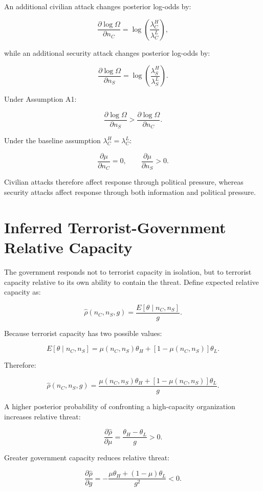 \documentclass[
  letterpaper,
  DIV=11,
  numbers=noendperiod]{scrartcl}
\begin{document}
An additional civilian attack changes posterior log-odds by:

\[
\frac{\partial\log\Omega}{\partial n_C}
=
\log\left(\frac{\lambda_C^H}{\lambda_C^L}\right),
\tag{5}
\]

while an additional security attack changes posterior log-odds by:

\[
\frac{\partial\log\Omega}{\partial n_S}
=
\log\left(\frac{\lambda_S^H}{\lambda_S^L}\right).
\tag{6}
\]

Under Assumption A1:

\[
\boxed{
\frac{\partial\log\Omega}{\partial n_S}
>
\frac{\partial\log\Omega}{\partial n_C}.
}
\tag{7}
\]

Under the baseline assumption \(\lambda_C^H=\lambda_C^L\):

\[
\frac{\partial\mu}{\partial n_C}=0,
\qquad
\frac{\partial\mu}{\partial n_S}>0.
\tag{8}
\]

Civilian attacks therefore affect response through political pressure,
whereas security attacks affect response through both information and
political pressure.

\section{Inferred Terrorist-Government Relative
Capacity}\label{inferred-terrorist-government-relative-capacity}

The government responds not to terrorist capacity in isolation, but to
terrorist capacity relative to its own ability to contain the threat.
Define expected relative capacity as:

\[
\boxed{
\widehat{\rho}(n_C,n_S,g)
=
\frac{E[\theta\mid n_C,n_S]}{g}.
}
\tag{9}
\]

Because terrorist capacity has two possible values:

\[
E[\theta\mid n_C,n_S]
=
\mu(n_C,n_S)\theta_H
+[1-\mu(n_C,n_S)]\theta_L.
\]

Therefore:

\[
\boxed{
\widehat{\rho}(n_C,n_S,g)
=
\frac{\mu(n_C,n_S)\theta_H+[1-\mu(n_C,n_S)]\theta_L}{g}.
}
\tag{10}
\]

A higher posterior probability of confronting a high-capacity
organization increases relative threat:

\[
\frac{\partial\widehat{\rho}}{\partial\mu}
=
\frac{\theta_H-\theta_L}{g}>0.
\tag{11}
\]

Greater government capacity reduces relative threat:

\[
\boxed{
\frac{\partial\widehat{\rho}}{\partial g}
=
-\frac{\mu\theta_H+(1-\mu)\theta_L}{g^2}<0.
}
\tag{12}
\]
\end{document}

